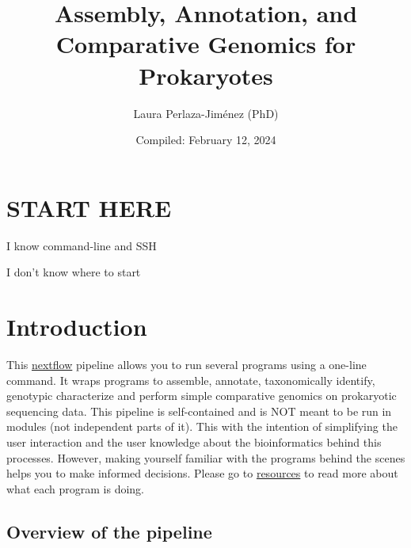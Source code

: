 \documentclass[
]{book}
\title{Assembly, Annotation, and Comparative Genomics for Prokaryotes}
\author{Laura Perlaza-Jiménez (PhD)}
\date{Compiled: February 12, 2024}
\begin{document}
\maketitle

{
\setcounter{tocdepth}{1}
\tableofcontents
}
\hypertarget{start-here}{%
\chapter{START HERE}\label{start-here}}

{I know command-line and SSH}

{I don't know where to start}

\hypertarget{introduction}{%
\chapter{Introduction}\label{introduction}}

This \href{https://www.nextflow.io/}{nextflow} pipeline allows you to run several programs using a one-line command. It wraps programs to assemble, annotate, taxonomically identify, genotypic characterize and perform simple comparative genomics on prokaryotic sequencing data. This pipeline is self-contained and is NOT meant to be run in modules (not independent parts of it). This with the intention of simplifying the user interaction and the user knowledge about the bioinformatics behind this processes. However, making yourself familiar with the programs behind the scenes helps you to make informed decisions. Please go to \href{resources.html}{resources} to read more about what each program is doing.

\hypertarget{overview-of-the-pipeline}{%
\section{Overview of the pipeline}\label{overview-of-the-pipeline}}
\end{document}

